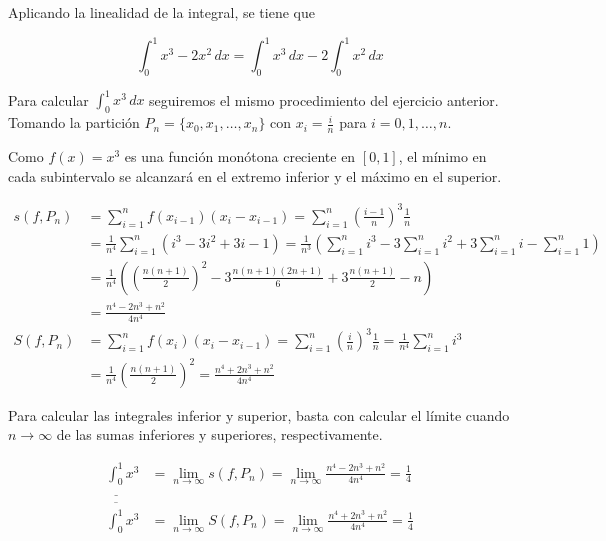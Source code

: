 \documentclass[
  spanish,
  a4paper,
]{scrreport}
\theoremstyle{definition}
\theoremstyle{remark}
\begin{document}
\begin{tcolorbox}[enhanced jigsaw, arc=.35mm, bottomrule=.15mm, bottomtitle=1mm, breakable, colback=white, colbacktitle=quarto-callout-tip-color!10!white, colframe=quarto-callout-tip-color-frame, coltitle=black, left=2mm, leftrule=.75mm, opacityback=0, opacitybacktitle=0.6, rightrule=.15mm, title=\textcolor{quarto-callout-tip-color}{\faLightbulb}\hspace{0.5em}{Solución}, titlerule=0mm, toprule=.15mm, toptitle=1mm]

Aplicando la linealidad de la integral, se tiene que

\[
\int_0^1 x^3-2x^2\,dx = \int_0^1 x^3\, dx -2\int_0^1 x^2\, dx
\]

Para calcular \(\int_0^1 x^3\,dx\) seguiremos el mismo procedimiento del
ejercicio anterior. Tomando la partición
\(P_n = \{x_0, x_1,\ldots, x_n\}\) con \(x_i = \frac{i}{n}\) para
\(i=0,1,\ldots, n\).

Como \(f(x)=x^3\) es una función monótona creciente en \([0,1]\), el
mínimo en cada subintervalo se alcanzará en el extremo inferior y el
máximo en el superior.

\begin{align*}
s(f,P_n) 
&= \sum_{i=1}^n f(x_{i-1})(x_i-x_{i-1}) = \sum_{i=1}^n \left(\frac{i-1}{n}\right)^3 \frac{1}{n}\\
& = \frac{1}{n^4} \sum_{i=1}^n (i^3-3i^2+3i-1) 
= \frac{1}{n^3} \left(\sum_{i=1}^n i^3 - 3\sum_{i=1}^n i^2 + 3\sum_{i=1}^n i - \sum_{i=1}^n 1\right)\\
& = \frac{1}{n^4} \left(\left(\frac{n(n+1)}{2}\right)^2 - 3\frac{n(n+1)(2n+1)}{6} + 3\frac{n(n+1)}{2} - n\right) \\
& = \frac{n^4-2n^3+n^2}{4n^4}\\
S(f,P_n) 
&= \sum_{i=1}^n f(x_{i})(x_i-x_{i-1}) 
= \sum_{i=1}^n \left(\frac{i}{n}\right)^3 \frac{1}{n}
= \frac{1}{n^4} \sum_{i=1}^n i^3 \\
& = \frac{1}{n^4} \left(\frac{n(n+1)}{2}\right)^2 
= \frac{n^4+2n^3+n^2}{4n^4}
\end{align*}

Para calcular las integrales inferior y superior, basta con calcular el
límite cuando \(n\to\infty\) de las sumas inferiores y superiores,
respectivamente.

\begin{align*}
\underline{\int_0^1} x^3 
& = \lim_{n\to\infty} s(f,P_n) = \lim_{n\to\infty} \frac{n^4-2n^3+n^2}{4n^4} = \frac{1}{4}\\
\overline{\int_0^1} x^3 
& = \lim_{n\to\infty} S(f,P_n) = \lim_{n\to\infty} \frac{n^4+2n^3+n^2}{4n^4} = \frac{1}{4}
\end{align*}


\end{tcolorbox}
\end{document}
